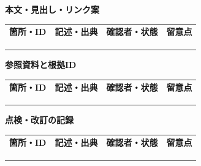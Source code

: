 \documentclass[11pt,a4paper]{article}
\begin{document}
\par{}\noindent\textbf{本文・見出し・リンク案}\par\vspace{1mm}
{\fontsize{8.5}{13}\selectfont
\begin{tabularx}{\linewidth}{@{}XXXX@{}}
\textbf{箇所・ID} & \textbf{記述・出典} & \textbf{確認者・状態} & \textbf{留意点}\\[2mm]
\strut & \strut & \strut & \strut\\[5mm]
\strut & \strut & \strut & \strut\\[5mm]
\strut & \strut & \strut & \strut\\[5mm]
\end{tabularx}
}\vspace{2mm}\par
{}
\par{}\noindent\textbf{参照資料と根拠ID}\par\vspace{1mm}
{\fontsize{8.5}{13}\selectfont
\begin{tabularx}{\linewidth}{@{}XXXX@{}}
\textbf{箇所・ID} & \textbf{記述・出典} & \textbf{確認者・状態} & \textbf{留意点}\\[2mm]
\strut & \strut & \strut & \strut\\[5mm]
\strut & \strut & \strut & \strut\\[5mm]
\strut & \strut & \strut & \strut\\[5mm]
\end{tabularx}
}\vspace{2mm}\par
{}
\par{}\noindent\textbf{点検・改訂の記録}\par\vspace{1mm}
{\fontsize{8.5}{13}\selectfont
\begin{tabularx}{\linewidth}{@{}XXXX@{}}
\textbf{箇所・ID} & \textbf{記述・出典} & \textbf{確認者・状態} & \textbf{留意点}\\[2mm]
\strut & \strut & \strut & \strut\\[5mm]
\strut & \strut & \strut & \strut\\[5mm]
\strut & \strut & \strut & \strut\\[5mm]
\end{tabularx}
}\vspace{2mm}\par
\end{document}
